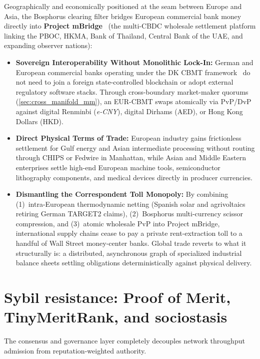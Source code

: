 \documentclass[a4paper,11pt,twoside,parskip=half-,headings=small]{scrartcl}
\begin{document}
Geographically and economically positioned at the seam between Europe and Asia, the Bosphorus clearing filter bridges European commercial bank money directly into \textbf{Project mBridge}~\cite{bis2024mbridge} (the multi-CBDC wholesale settlement platform linking the PBOC, HKMA, Bank of Thailand, Central Bank of the UAE, and expanding observer nations):
\begin{itemize}[nosep]
  \item \textbf{Sovereign Interoperability Without Monolithic Lock-In:} German and European commercial banks operating under the DK CBMT framework~\cite{dk2023cbmt} do not need to join a foreign state-controlled blockchain or adopt external regulatory software stacks. Through cross-boundary market-maker quorums (\cref{sec:cross_manifold_mm}), an EUR-CBMT swaps atomically via PvP/DvP against digital Renminbi (\emph{e-CNY}), digital Dirhams (AED), or Hong Kong Dollars (HKD).
  \item \textbf{Direct Physical Terms of Trade:} European industry gains frictionless settlement for Gulf energy and Asian intermediate processing without routing through CHIPS or Fedwire in Manhattan, while Asian and Middle Eastern enterprises settle high-end European machine tools, semiconductor lithography components, and medical devices directly in producer currencies.
  \item \textbf{Dismantling the Correspondent Toll Monopoly:} By combining (1)~intra-European thermodynamic netting (Spanish solar and agrivoltaics retiring German TARGET2 claims), (2)~Bosphorus multi-currency scissor compression, and (3)~atomic wholesale PvP into Project mBridge, international supply chains cease to pay a private rent-extraction toll to a handful of Wall Street money-center banks. Global trade reverts to what it structurally is: a distributed, asynchronous graph of specialized industrial balance sheets settling obligations deterministically against physical delivery.
\end{itemize}

\section{Sybil resistance: Proof of Merit, TinyMeritRank, and sociostasis}
\label{sec:sybil}

The consensus and governance layer completely decouples network throughput admission
from reputation-weighted authority.
\end{document}

